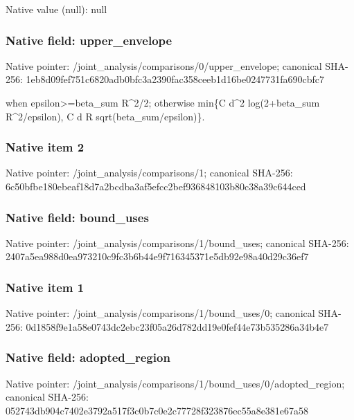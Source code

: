 \documentclass[10pt,a4paper]{article}
\begin{document}
Native value (null): null

\subsubsection{Native field: upper\_\allowbreak{}envelope}
Native pointer: /joint\_\allowbreak{}analysis/comparisons/0/upper\_\allowbreak{}envelope; canonical SHA-256: 1eb8d09fef751c6820adb0bfc3a2390fac358ceeb1d16be0247731fa690cbfc7

\begingroup\raggedright{} when epsilon>=\allowbreak{}beta\_\allowbreak{}sum R\textasciicircum{}2/\allowbreak{}2;\allowbreak{} otherwise min\{C d\textasciicircum{}2 log(2+beta\_\allowbreak{}sum R\textasciicircum{}2/\allowbreak{}epsilon),\allowbreak{} C d R sqrt(beta\_\allowbreak{}sum/\allowbreak{}epsilon)\}.\par\endgroup

\subsubsection{Native item 2}
Native pointer: /joint\_\allowbreak{}analysis/comparisons/1; canonical SHA-256: 6c50bfbe180ebeaf18d7a2bcdba3af5efcc2bef936848103b80c38a39c644ced

\subsubsection{Native field: bound\_\allowbreak{}uses}
Native pointer: /joint\_\allowbreak{}analysis/comparisons/1/bound\_\allowbreak{}uses; canonical SHA-256: 2407a5ea988d0ea973210c9fc3b6b44e9f716345371e5db92e98a40d29c36ef7

\subsubsection{Native item 1}
Native pointer: /joint\_\allowbreak{}analysis/comparisons/1/bound\_\allowbreak{}uses/0; canonical SHA-256: 0d1858f9e1a58e0743dc2ebc23f05a26d782dd19e0fef44e73b535286a34b4e7

\subsubsection{Native field: adopted\_\allowbreak{}region}
Native pointer: /joint\_\allowbreak{}analysis/comparisons/1/bound\_\allowbreak{}uses/0/adopted\_\allowbreak{}region; canonical SHA-256: 052743db904c7402e3792a517f3c0b7c0e2c77728f323876ec55a8e381e67a58
\end{document}
